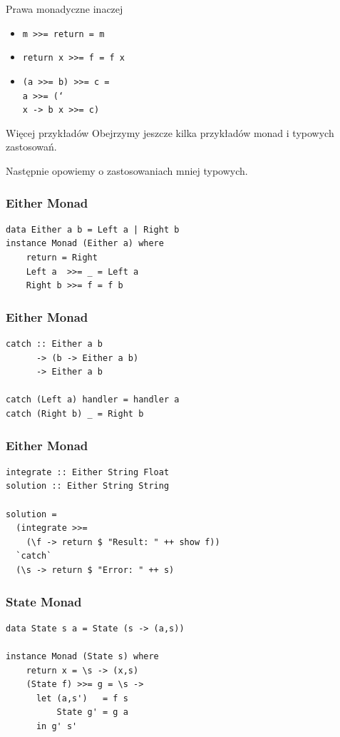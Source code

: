 \documentclass[14pt]{beamer}
\begin{document}
\begin{frame}{Prawa monadyczne inaczej}
    \begin{itemize}
        \item \texttt{m >>= return = m}
        \item \texttt{return x >>= f = f x}
        \item \texttt{(a >>= b) >>= c =\\
            a >>= (\char`\\x -> b x >>= c)}
    \end{itemize}
\end{frame}

\begin{frame}{Więcej przykładów}
    Obejrzymy jeszcze kilka przykładów monad i typowych zastosowań.

    Następnie opowiemy o zastosowaniach mniej typowych.
\end{frame}

\begin{frame}[fragile]
\frametitle{Either Monad}
\begin{verbatim}
data Either a b = Left a | Right b
instance Monad (Either a) where
    return = Right
    Left a  >>= _ = Left a
    Right b >>= f = f b
\end{verbatim}
\end{frame}

\begin{frame}[fragile]
\frametitle{Either Monad}
\begin{verbatim}
catch :: Either a b
      -> (b -> Either a b)
      -> Either a b

catch (Left a) handler = handler a
catch (Right b) _ = Right b
\end{verbatim}
\end{frame}

\begin{frame}[fragile]
\frametitle{Either Monad}
\begin{verbatim}
integrate :: Either String Float
solution :: Either String String

solution = 
  (integrate >>= 
    (\f -> return $ "Result: " ++ show f))
  `catch`
  (\s -> return $ "Error: " ++ s)
\end{verbatim}
\end{frame}

\begin{frame}[fragile]
\frametitle{State Monad}
\begin{verbatim}
data State s a = State (s -> (a,s))

instance Monad (State s) where
    return x = \s -> (x,s)
    (State f) >>= g = \s ->
      let (a,s')   = f s
          State g' = g a
      in g' s'
\end{verbatim}
\end{frame}
\end{document}
